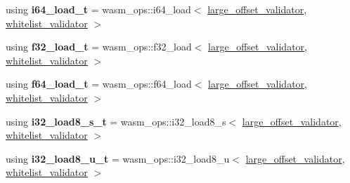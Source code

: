 \begin{DoxyCompactItemize}
using {\bfseries i64\+\_\+load\+\_\+t} = wasm\+\_\+ops\+::i64\+\_\+load$<$ \mbox{\hyperlink{structaacio_1_1chain_1_1wasm__validations_1_1large__offset__validator}{large\+\_\+offset\+\_\+validator}}, \mbox{\hyperlink{structaacio_1_1chain_1_1wasm__validations_1_1whitelist__validator}{whitelist\+\_\+validator}} $>$
\item 
\mbox{\label{structaacio_1_1chain_1_1wasm__validations_1_1op__constrainers_ac4606908883cc40459aa091ce06da224}} 
using {\bfseries f32\+\_\+load\+\_\+t} = wasm\+\_\+ops\+::f32\+\_\+load$<$ \mbox{\hyperlink{structaacio_1_1chain_1_1wasm__validations_1_1large__offset__validator}{large\+\_\+offset\+\_\+validator}}, \mbox{\hyperlink{structaacio_1_1chain_1_1wasm__validations_1_1whitelist__validator}{whitelist\+\_\+validator}} $>$
\item 
\mbox{\label{structaacio_1_1chain_1_1wasm__validations_1_1op__constrainers_a7e0466b84e3928c1c98fe6aa9a56ecff}} 
using {\bfseries f64\+\_\+load\+\_\+t} = wasm\+\_\+ops\+::f64\+\_\+load$<$ \mbox{\hyperlink{structaacio_1_1chain_1_1wasm__validations_1_1large__offset__validator}{large\+\_\+offset\+\_\+validator}}, \mbox{\hyperlink{structaacio_1_1chain_1_1wasm__validations_1_1whitelist__validator}{whitelist\+\_\+validator}} $>$
\item 
\mbox{\label{structaacio_1_1chain_1_1wasm__validations_1_1op__constrainers_ae8c5058adbc52a10c815209ecb8f87ad}} 
using {\bfseries i32\+\_\+load8\+\_\+s\+\_\+t} = wasm\+\_\+ops\+::i32\+\_\+load8\+\_\+s$<$ \mbox{\hyperlink{structaacio_1_1chain_1_1wasm__validations_1_1large__offset__validator}{large\+\_\+offset\+\_\+validator}}, \mbox{\hyperlink{structaacio_1_1chain_1_1wasm__validations_1_1whitelist__validator}{whitelist\+\_\+validator}} $>$
\item 
\mbox{\label{structaacio_1_1chain_1_1wasm__validations_1_1op__constrainers_af33afe930a6c934ca22fd4d0ea967501}} 
using {\bfseries i32\+\_\+load8\+\_\+u\+\_\+t} = wasm\+\_\+ops\+::i32\+\_\+load8\+\_\+u$<$ \mbox{\hyperlink{structaacio_1_1chain_1_1wasm__validations_1_1large__offset__validator}{large\+\_\+offset\+\_\+validator}}, \mbox{\hyperlink{structaacio_1_1chain_1_1wasm__validations_1_1whitelist__validator}{whitelist\+\_\+validator}} $>$

\end{DoxyCompactItemize}
